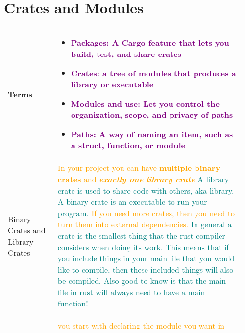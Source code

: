 \documentclass[main.tex,fontsize=8pt,paper=a4,paper=portrait,DIV=calc,]{scrartcl}
\begin{document}
\begin{table}[ht!]
\section{Crates and Modules}
\begin{tabular}{|m{0.2\linewidth}|m{0.755\linewidth}|}
\hline
Terms &
\vspace{2mm}
\begin{itemize}
\item \textcolor{purple}{Packages: A Cargo feature that lets you build, test, and share crates}
\item \textcolor{purple}{Crates: a tree of modules that produces a library or executable}
\item \textcolor{purple}{Modules and use: Let you control the organization, scope, and privacy of paths}
\item \textcolor{purple}{Paths: A way of naming an item, such as a struct, function, or module}
\vspace{-3mm}
\end{itemize}\\
\hline
Binary Crates and Library Crates &
\textcolor{orange}{In your project you can have \textbf{multiple binary crates} and \textbf{\textit{exactly one library crate}}}\newline
\textcolor{teal}{A library crate is used to share code with others, aka library. \newline
A binary crate is an executable to run your program.}\newline
\textcolor{orange}{If you need more crates, then you need to turn them into external dependencies.}\newline
\textcolor{teal}{In general a crate is the smallest thing that the rust compiler considers when doing its work.\newline
This means that if you include things in your main file that you would like to compile, then these included things will also be compiled.\newline
Also good to know is that the main file in rust will always need to have a main function!}\\
\hline
Defining Modules & 
\textcolor{orange}{you start with declaring the module you want in the \textbf{crate root file}\newline
{src/lib.rs for a library crate or src/main.rs for a binary crate.})}\newline
\begin{lstlisting}
// in lib.rs
mod pingpang; // this declares the module
// in pingpang.rs

\end{lstlisting}
\end{tabular}
\end{table}
\end{document}
